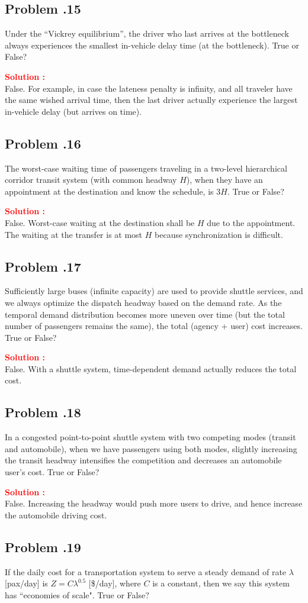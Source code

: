 \documentclass[12pt]{article}
\newcommand{\customsubsection}[1]{
  \subsection*{Problem \thesection.#1}
}
\begin{document}
\newpage

\customsubsection{15}
Under the “Vickrey equilibrium”, the driver who last arrives at the bottleneck always experiences the smallest in-vehicle delay time (at the bottleneck). True or False?


\textbf{\textcolor{red}{Solution :}} \\
False. For example, in case the lateness penalty is infinity, and all traveler have the same wished arrival time, then the last driver actually experience the largest in-vehicle delay (but arrives on time).
\newpage


\customsubsection{16}
The worst-case waiting time of passengers traveling in a two-level hierarchical corridor transit system (with common headway $H$), when they have an appointment at the destination and know the schedule, is $3H$. True or False?


\textbf{\textcolor{red}{Solution :}} \\
False. Worst-case waiting at the destination shall be $H$ due to the appointment. The waiting at the transfer is at most $H$ because synchronization is difficult. 

\newpage


\customsubsection{17}
Sufficiently large buses (infinite capacity) are used to provide shuttle services, and we always optimize the dispatch headway based on the demand rate. As the temporal demand distribution becomes more uneven over time (but the total number of passengers remains the same), the total (agency + user) cost increases. True or False?


\textbf{\textcolor{red}{Solution :}} \\
False. With a shuttle system, time-dependent demand actually reduces the total cost.
\newpage


\customsubsection{18}
In a congested point-to-point shuttle system with two competing modes (transit and automobile), when we have passengers using both modes, slightly increasing the transit headway intensifies the competition and decreases an automobile user’s cost. True or False?

\textbf{\textcolor{red}{Solution :}} \\
False. Increasing the headway would push more users to drive, and hence increase the automobile driving cost.

\newpage

\customsubsection{19}
If the daily cost for a transportation system to serve a steady demand of rate $\lambda$ [pax/day] is $ Z= C\lambda^{0.5}$ [\$/day], where $C$ is a constant, then we say this system has ``economies of scale". True or False?
\end{document}
